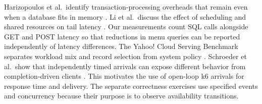 Harizopoulos et al.\ identify transaction-processing overheads that remain even when a database fits in memory \cite{harizopoulos2008}. Li et al.\ discuss the effect of scheduling and shared resources on tail latency \cite{li2014}. Our measurements count SQL calls alongside GET and POST latency so that reductions in menu queries can be reported independently of latency differences. The Yahoo! Cloud Serving Benchmark separates workload mix and record selection from system policy \cite{cooper2010}. Schroeder et al.\ show that independently timed arrivals can expose different behavior from completion-driven clients \cite{schroeder2006}. This motivates the use of open-loop k6 arrivals for response time and delivery. The separate correctness exercises use specified events and concurrency because their purpose is to observe availability transitions.

